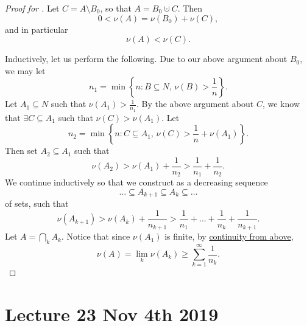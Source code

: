 \documentclass[notoc,notitlepage]{tufte-book}
\begin{document}
\begin{proof}[Proof for ]
  Let $C = A \setminus B_0$, so that $A = B_0 \cupdot C$.
  Then
  \begin{equation*}
    0 < \nu(A) = \nu(B_0) + \nu(C),
  \end{equation*}
  and in particular
  \begin{equation*}
    \nu(A) < \nu(C).
  \end{equation*}

  Inductively, let us perform the following.
  Due to our above argument about $B_0$, we may let
  \begin{equation*}
    n_1 = \min \left\{ n : B \subseteq N,\, \nu(B) > \frac{1}{n} \right\}.
  \end{equation*}
  Let $A_1 \subseteq N$ such that $\nu(A_1) > \frac{1}{n_1}$.
  By the above argument about $C$, we know that $\exists C \subseteq A_1$
  such that $\nu(C) > \nu(A_1)$.
  Let
  \begin{equation*}
    n_2 = \min \left\{ n : C \subseteq A_1,\,
      \nu(C) > \frac{1}{n} + \nu(A_1) \right\}.
  \end{equation*}
  Then set $A_2 \subseteq A_1$ such that
  \begin{equation*}
    \nu(A_2) > \nu(A_1) + \frac{1}{n_2} > \frac{1}{n_1} + \frac{1}{n_2}.
  \end{equation*}
  We continue inductively so that we construct as a decreasing sequence
  \begin{equation*}
    \hdots \subseteq A_{k+1} \subseteq A_k \subseteq \hdots
  \end{equation*}
  of sets, such that
  \begin{equation*}
    \nu(A_{k+1}) > \nu(A_k) + \frac{1}{n_{k+1}}
               > \frac{1}{n_1} + \hdots + \frac{1}{n_k} + \frac{1}{n_{k+1}}.
  \end{equation*}
  Let $A = \bigcap_k A_k$.
  Notice that since $\nu(A_1)$ is finite,
  by \hyperref[thm:properties_of_a_measure]{continuity from above},
  \begin{equation*}
    \nu(A) = \lim_{k} \nu(A_k) \geq \sum_{k=1}^{\infty} \frac{1}{n_k}.
  \end{equation*}
\end{proof}



\chapter{Lecture 23 Nov 4th 2019}%
\label{chp:lecture_23_nov_4th_2019}
\end{document}
